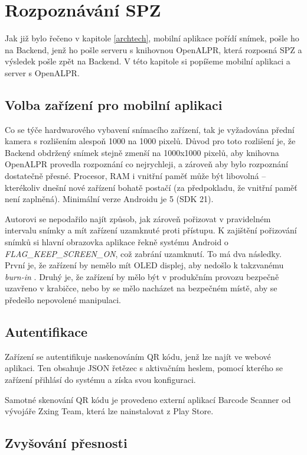 
\chapter{Rozpoznávání SPZ}

Jak již bylo řečeno v kapitole \ref{archtech}, mobilní aplikace pořídí snímek,
pošle ho na Backend, jenž ho pošle serveru s knihovnou OpenALPR, která
rozposná SPZ a výsledek pošle zpět na Backend. V této kapitole si popíšeme
mobilní aplikaci a server s OpenALPR.

\section{Volba zařízení pro mobilní aplikaci}

Co se týče hardwarového vybavení snímacího zařízení, tak je vyžadována přední kamera
s rozlišením alespoň 1000 na 1000 pixelů. Důvod pro toto rozlišení je, že Backend obdržený snímek
stejně zmenší na 1000x1000 pixelů, aby knihovna OpenALPR provedla rozpoznání co nejrychleji, a zároveň
aby bylo rozpoznání dostatečně přesné. Procesor, RAM i vnitřní paměť může být libovolná -- kterékoliv
dnešní nové zařízení bohatě postačí (za předpokladu, že vnitřní paměť není zaplněná).
Minimální verze Androidu je 5 (SDK 21).

Autorovi se nepodařilo najít způsob, jak zároveň pořizovat v pravidelném intervalu snímky
a mít zařízení uzamknuté proti přístupu. K zajištění pořizování snímků si hlavní
obrazovka aplikace řekně systému Android o \textit{FLAG\_KEEP\_SCREEN\_ON}, což zabrání uzamknutí.
To má dva následky. První je, že zařízení by nemělo mít OLED displej, aby nedošlo k takzvanému
\textit{burn-in} \citep[viz][]{OledBurnIn}. Druhý je, že zařízení by mělo být v produkčním provozu
bezpečně uzavřeno v krabičce, nebo by se mělo nacházet na bezpečném místě, aby se předešlo
nepovolené manipulaci.

\section{Autentifikace}

Zařízení se autentifikuje naskenováním QR kódu, jenž lze najít ve webové aplikaci. Ten obsahuje
JSON řetězec s aktivačním heslem, pomocí kterého se zařízení přihlásí do systému a získa svou konfiguraci.

Samotné skenování QR kódu je provedeno externí aplikací Barcode Scanner od vývojáře
Zxing Team, která lze nainstalovat z Play Store.

\section{Zvyšování přesnosti}

